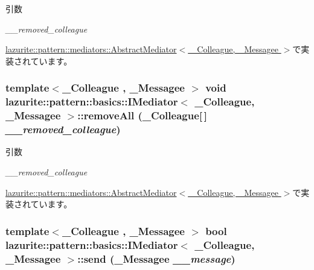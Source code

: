 \begin{DoxyParams}{引数}
\item[{\em \_\-\_\-removed\_\-colleague}]\end{DoxyParams}


\hyperlink{classlazurite_1_1pattern_1_1mediators_1_1_abstract_mediator_3_01___colleague_00_01___messagee_01_4_ab96e1fc164c5681a0ef3d950434c69e7}{lazurite::pattern::mediators::AbstractMediator$<$ \_\-Colleague, \_\-Messagee $>$}で実装されています。\hypertarget{interfacelazurite_1_1pattern_1_1basics_1_1_i_mediator_3_01___colleague_00_01___messagee_01_4_ab594b14be1fa04f9445ad1737115cb80}{
\subsubsection[{removeAll}]{\setlength{\rightskip}{0pt plus 5cm}template$<$\_\-Colleague , \_\-Messagee $>$ void lazurite::pattern::basics::IMediator$<$ \_\-Colleague, \_\-Messagee $>$::removeAll (\_\-Colleague\mbox{[}$\,$\mbox{]} {\em \_\-\_\-removed\_\-colleague})}}
\label{interfacelazurite_1_1pattern_1_1basics_1_1_i_mediator_3_01___colleague_00_01___messagee_01_4_ab594b14be1fa04f9445ad1737115cb80}

\begin{DoxyParams}{引数}
\item[{\em \_\-\_\-removed\_\-colleague}]\end{DoxyParams}


\hyperlink{classlazurite_1_1pattern_1_1mediators_1_1_abstract_mediator_3_01___colleague_00_01___messagee_01_4_acbc1ecdf4cc271a5793a7631bb692741}{lazurite::pattern::mediators::AbstractMediator$<$ \_\-Colleague, \_\-Messagee $>$}で実装されています。\hypertarget{interfacelazurite_1_1pattern_1_1basics_1_1_i_mediator_3_01___colleague_00_01___messagee_01_4_a82cd22f9cc946dcaa4be2a2cf87674b3}{
\subsubsection[{send}]{\setlength{\rightskip}{0pt plus 5cm}template$<$\_\-Colleague , \_\-Messagee $>$ bool lazurite::pattern::basics::IMediator$<$ \_\-Colleague, \_\-Messagee $>$::send (\_\-Messagee {\em \_\-\_\-message})}}
\label{interfacelazurite_1_1pattern_1_1basics_1_1_i_mediator_3_01___colleague_00_01___messagee_01_4_a82cd22f9cc946dcaa4be2a2cf87674b3}

